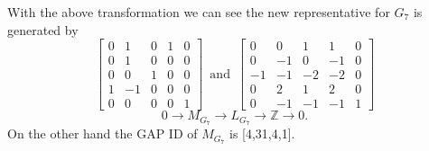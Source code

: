 \documentclass{article}
\theoremstyle{plain}
\theoremstyle{definition}
\newcommand{\Z}{\ensuremath{\mathbb{Z}}}
\newcommand{\tand}{\ensuremath{\,\,\, \text{and} \,\,\,}}
\newcommand{\exactseq}[1]{\ensuremath{0 \longrightarrow M_{#1} \longrightarrow L_{#1} \longrightarrow \Z \longrightarrow 0}}
\begin{document}
With the above transformation we can see the new representative for $G_7$ is generated by 
$$
\left[ \begin {array}{cccc|c} 0&1&0&1&0\\  0&1&0&0&0
\\  0&0&1&0&0\\  1&-1&0&0&0
\\  \hline 0&0&0&0&1\end {array} \right] 
\tand
 \left[ \begin {array}{cccc|c} 0&0&1&1&0\\  0&-1&0&-1&0
\\  -1&-1&-2&-2&0\\  0&2&1&2&0
\\ \hline 0&-1&-1&-1&1\end {array} \right] 
$$
$$
\exactseq{G_7}
.$$
On the other hand the GAP ID of $M_{G_7}$ is 
 [4,31,4,1].
\end{document}
